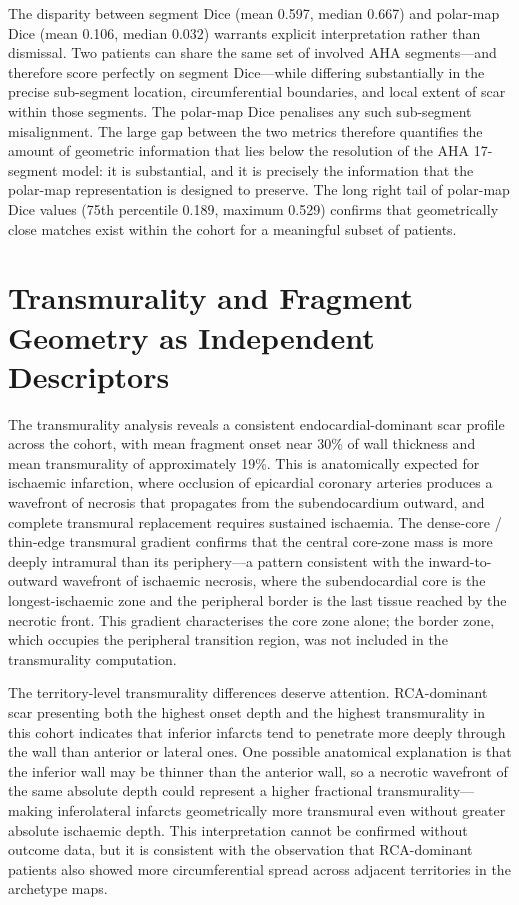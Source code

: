The disparity between segment Dice (mean 0.597, median 0.667) and polar-map Dice
(mean 0.106, median 0.032) warrants explicit interpretation rather than dismissal. Two
patients can share the same set of involved AHA segments---and therefore score perfectly on
segment Dice---while differing substantially in the precise sub-segment location,
circumferential boundaries, and local extent of scar within those segments. The polar-map
Dice penalises any such sub-segment misalignment. The large gap between the two metrics therefore
quantifies the amount of geometric information that lies below the resolution of the AHA
17-segment model: it is substantial, and it is precisely the information that the polar-map
representation is designed to preserve. The long right tail of polar-map Dice values (75th percentile 0.189, maximum 0.529)
confirms that geometrically close matches exist within the cohort for a meaningful subset
of patients.

\section{Transmurality and Fragment Geometry as Independent Descriptors}
\label{sec:transmurality_discussion}

The transmurality analysis reveals a consistent endocardial-dominant scar profile across the
cohort, with mean fragment onset near 30\% of wall thickness and mean transmurality of
approximately 19\%. This is anatomically expected for ischaemic infarction, where occlusion
of epicardial coronary arteries produces a wavefront of necrosis that propagates from the
subendocardium outward, and complete transmural replacement requires sustained
ischaemia. The dense-core / thin-edge transmural gradient confirms that the central core-zone mass is
more deeply intramural than its periphery---a pattern consistent with the inward-to-outward
wavefront of ischaemic necrosis, where the subendocardial core is the longest-ischaemic
zone and the peripheral border is the last tissue reached by the necrotic front. This gradient
characterises the core zone alone; the border zone, which occupies the peripheral transition
region, was not included in the transmurality computation.

The territory-level transmurality differences deserve attention. RCA-dominant scar
presenting both the highest onset depth and the highest transmurality in this cohort indicates
that inferior infarcts tend to penetrate more deeply through the wall than anterior or lateral
ones. One possible anatomical explanation is that the inferior wall may be thinner than the
anterior wall, so a necrotic wavefront of the same absolute depth could represent a higher
fractional transmurality---making inferolateral infarcts geometrically more transmural even
without greater absolute ischaemic depth. This interpretation cannot be confirmed without outcome
data, but it is consistent with the observation that RCA-dominant patients also showed more
circumferential spread across adjacent territories in the archetype maps.


